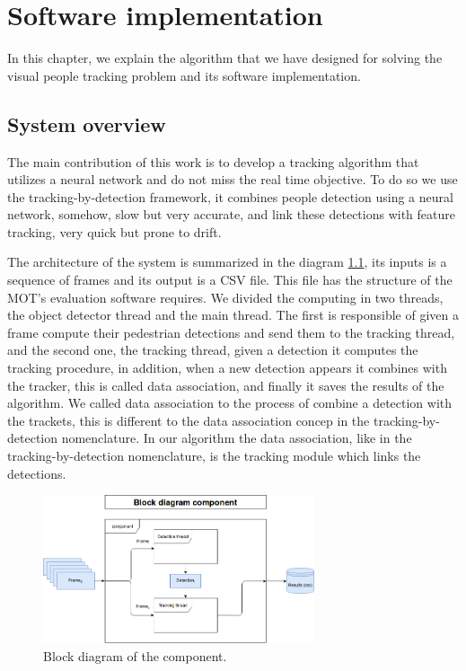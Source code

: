 \chapter{Software implementation}\label{cap.software}

In this chapter, we explain the algorithm that we have designed for solving the visual people tracking problem and its software implementation. 

\section{System overview}

The main contribution of this work is to develop a tracking algorithm that utilizes a neural network and do not miss the real time objective. To do so we use the tracking-by-detection framework, it combines people detection using a neural network, somehow, slow but very accurate, and link these detections with feature tracking, very quick but prone to drift. 

The architecture of the system is summarized in the diagram \ref{software1}, its inputs is a sequence of frames and its output is a CSV file. This file has the structure of the MOT's evaluation software requires. We divided the computing in two threads, the object detector thread and the main thread. The first is responsible of given a frame compute their pedestrian detections and send them to the tracking thread, and the second one, the tracking thread, given a detection it computes the tracking procedure, in addition, when a new detection appears it combines with the tracker, this is called data association, and finally it saves the results of the algorithm. We called data association to the process of combine a detection with the trackets, this is different to the data association concep in the tracking-by-detection nomenclature. In our algorithm the data association, like in the tracking-by-detection nomenclature, is the tracking module which links the detections. 



\begin{figure}[H]
\centering         
\includegraphics[width=8cm]{flows/bloque.png}
\caption{Block diagram of the component.} \label{software1}
\end{figure}


